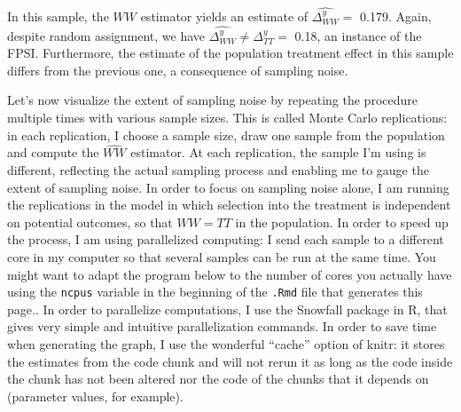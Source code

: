 \documentclass[]{book}
\theoremstyle{definition}
\theoremstyle{definition}
\theoremstyle{definition}
\theoremstyle{remark}
\begin{document}
In this sample, the \(WW\) estimator yields an estimate of
\(\hat{\Delta^y_{WW}}=\) 0.179. Again, despite random assignment, we
have \(\hat{\Delta^y_{WW}}\neq\Delta^y_{TT}=\) 0.18, an instance of the
FPSI. Furthermore, the estimate of the population treatment effect in
this sample differs from the previous one, a consequence of sampling
noise.

Let's now visualize the extent of sampling noise by repeating the
procedure multiple times with various sample sizes. This is called Monte
Carlo replications: in each replication, I choose a sample size, draw
one sample from the population and compute the \(\hat{WW}\) estimator.
At each replication, the sample I'm using is different, reflecting the
actual sampling process and enabling me to gauge the extent of sampling
noise. In order to focus on sampling noise alone, I am running the
replications in the model in which selection into the treatment is
independent on potential outcomes, so that \(WW=TT\) in the population.
In order to speed up the process, I am using parallelized computing: I
send each sample to a different core in my computer so that several
samples can be run at the same time. You might want to adapt the program
below to the number of cores you actually have using the \texttt{ncpus}
variable in the beginning of the \texttt{.Rmd} file that generates this
page.. In order to parallelize computations, I use the Snowfall package
in R, that gives very simple and intuitive parallelization commands. In
order to save time when generating the graph, I use the wonderful
``cache'' option of knitr: it stores the estimates from the code chunk
and will not rerun it as long as the code inside the chunk has not been
altered nor the code of the chunks that it depends on (parameter values,
for example).
\end{document}

